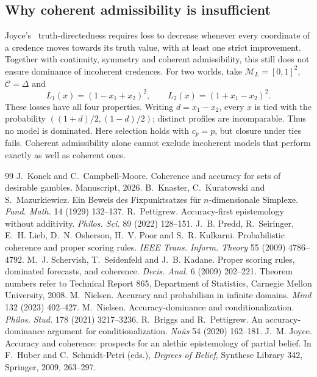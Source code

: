 \documentclass[11pt]{article}
\theoremstyle{definition}
\newcommand{\M}{\mathcal M}
\newcommand{\C}{\mathcal C}
\begin{document}
\subsection{Why coherent admissibility is insufficient}
Joyce's~\cite{Joyce} truth-directedness requires loss to decrease whenever every coordinate of a credence moves towards its truth value, with at least one strict improvement. Together with continuity, symmetry and coherent admissibility, this still does not ensure dominance of incoherent credences. For two worlds, take $\M_L=[0,1]^2$, $\C=\Delta$ and
\[
L_1(x)=(1-x_1+x_2)^2,\qquad L_2(x)=(1+x_1-x_2)^2.
\]
These losses have all four properties. Writing $d=x_1-x_2$, every $x$ is tied with the probability $((1+d)/2,(1-d)/2)$; distinct profiles are incomparable. Thus no model is dominated. Here selection holds with $c_p=p$, but closure under ties fails. Coherent admissibility alone cannot exclude incoherent models that perform exactly as well as coherent ones.

\begin{thebibliography}{99}
 J.~Konek and C.~Campbell-Moore. Coherence and accuracy for sets of desirable gambles. Manuscript, 2026.
 B.~Knaster, C.~Kuratowski and S.~Mazurkiewicz. Ein Beweis des Fixpunktsatzes f\"ur $n$-dimensionale Simplexe. \emph{Fund. Math.} 14 (1929) 132--137.
 R.~Pettigrew. Accuracy-first epistemology without additivity. \emph{Philos. Sci.} 89 (2022) 128--151.
 J.~B. Predd, R.~Seiringer, E.~H. Lieb, D.~N. Osherson, H.~V. Poor and S.~R. Kulkarni. Probabilistic coherence and proper scoring rules. \emph{IEEE Trans. Inform. Theory} 55 (2009) 4786--4792.
 M.~J. Schervish, T.~Seidenfeld and J.~B. Kadane. Proper scoring rules, dominated forecasts, and coherence. \emph{Decis. Anal.} 6 (2009) 202--221. Theorem numbers refer to Technical Report 865, Department of Statistics, Carnegie Mellon University, 2008.
 M.~Nielsen. Accuracy and probabilism in infinite domains. \emph{Mind} 132 (2023) 402--427.
 M.~Nielsen. Accuracy-dominance and conditionalization. \emph{Philos. Stud.} 178 (2021) 3217--3236.
 R.~Briggs and R.~Pettigrew. An accuracy-dominance argument for conditionalization. \emph{No\^us} 54 (2020) 162--181.
 J.~M. Joyce. Accuracy and coherence: prospects for an alethic epistemology of partial belief. In F.~Huber and C.~Schmidt-Petri (eds.), \emph{Degrees of Belief}, Synthese Library 342, Springer, 2009, 263--297.
\end{thebibliography}
\end{document}
